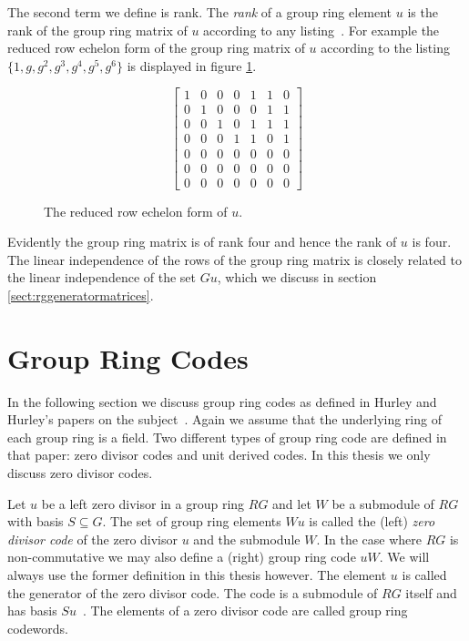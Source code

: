 The second term we define is rank.
The \emph{rank} of a group ring element $u$ is the rank of the group ring matrix of $u$ according to any listing~\cite{hur07,hur09}.
For example the reduced row echelon form of the group ring matrix of $u$ according to the listing $\{1,g,g^2,g^3,g^4,g^5,g^6\}$ is displayed in figure \ref{fig:rrefrgmatuc7}.
\begin{figure}[htbp]
\begin{center}
\[
\left[
\begin{array}{ccccccc}
1 & 0 & 0 & 0 & 1 & 1 & 0 \\
0 & 1 & 0 & 0 & 0 & 1 & 1 \\
0 & 0 & 1 & 0 & 1 & 1 & 1 \\
0 & 0 & 0 & 1 & 1 & 0 & 1 \\
0 & 0 & 0 & 0 & 0 & 0 & 0 \\
0 & 0 & 0 & 0 & 0 & 0 & 0 \\
0 & 0 & 0 & 0 & 0 & 0 & 0
\end{array}
\right]
\]
\caption{The reduced row echelon form of $u$.}
\label{fig:rrefrgmatuc7}
\end{center}
\end{figure}
Evidently the group ring matrix is of rank four and hence the rank of $u$ is four.
The linear independence of the rows of the group ring matrix is closely related to the linear independence of the set $Gu$, which we discuss in  section \ref{sect:rggeneratormatrices}.

\section{Group Ring Codes}
In the following section we discuss group ring codes as defined in Hurley and Hurley's papers on the subject~\cite{hur07,hur09}.
Again we assume that the underlying ring of each group ring is a field.
Two different types of group ring code are defined in that paper: zero divisor codes and unit derived codes.
In this thesis we only discuss zero divisor codes.

Let $u$ be a left zero divisor in a group ring $RG$ and let $W$ be a submodule of $RG$ with basis $S \subseteq G$.
The set of group ring elements $Wu$ is called the (left) \emph{zero divisor code} of the zero divisor $u$ and the submodule $W$.
In the case where $RG$ is non-commutative we may also define a (right) group ring code $uW$.
We will always use the former definition in this thesis however.
The element $u$ is called the generator of the zero divisor code.
The code is a submodule of $RG$ itself and has basis $Su$~\cite{hur07,hur09}.
The elements of a zero divisor code are called group ring codewords.

